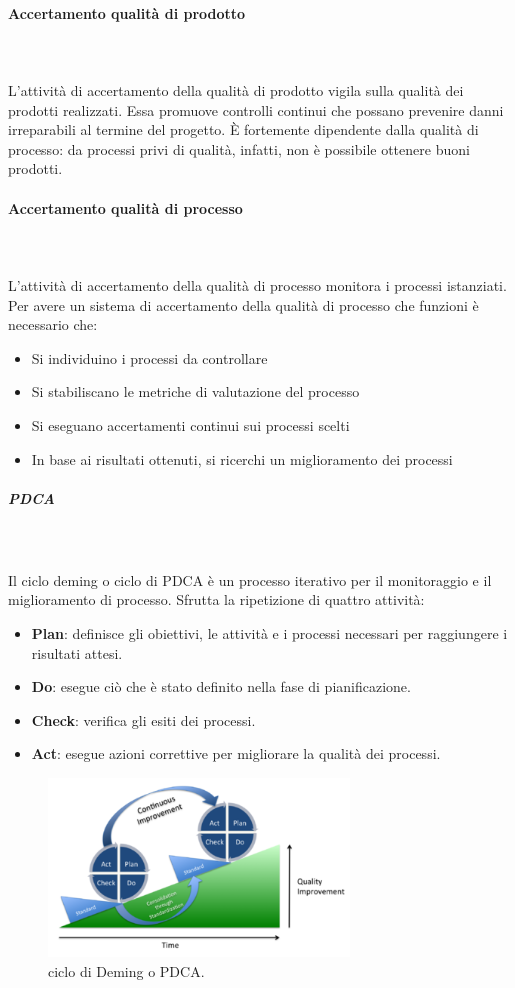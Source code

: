 \documentclass[../norme-di-progetto.tex]{subfiles}
\begin{document}
\paragraph{Accertamento qualità di prodotto}\mbox{}\\
\label{par:accertamento qualità di prodotto}
\\L'attività di accertamento della qualità di prodotto vigila sulla qualità dei prodotti realizzati. Essa promuove controlli continui che possano prevenire danni irreparabili al termine del progetto. È fortemente dipendente dalla qualità di processo: da processi privi di qualità, infatti, non è possibile ottenere buoni prodotti.  
\paragraph{Accertamento qualità di processo}\mbox{}\\
\label{par:accertamento qualità di processo}
\\L'attività di accertamento della qualità di processo monitora i processi istanziati. Per avere un sistema di accertamento della qualità di processo che funzioni è necessario che:
\begin{itemize}
	\item Si individuino i processi da controllare
	\item Si stabiliscano le metriche di valutazione del processo
	\item Si eseguano accertamenti continui sui processi scelti
	\item In base ai risultati ottenuti, si ricerchi un miglioramento dei processi
\end{itemize} 
\subparagraph{PDCA}\mbox{}\\
\label{subp:PDCA}
\\Il ciclo deming o ciclo di PDCA è un processo iterativo per il monitoraggio e il miglioramento di processo. Sfrutta la ripetizione di quattro attività:
\begin{itemize}
	\item \textbf{Plan}: definisce gli obiettivi, le attività e i processi necessari per raggiungere i risultati attesi.
	\item \textbf{Do}: esegue ciò che è stato definito nella fase di pianificazione.
	\item \textbf{Check}: verifica gli esiti dei processi.
	\item \textbf{Act}: esegue azioni correttive per migliorare la qualità dei processi.
\end{itemize}
\begin{figure}[H]
\includegraphics[width=8cm]{components/PDCA-process.png}
\centering
\caption{ciclo di Deming o PDCA.}
\end{figure}
\end{document}
